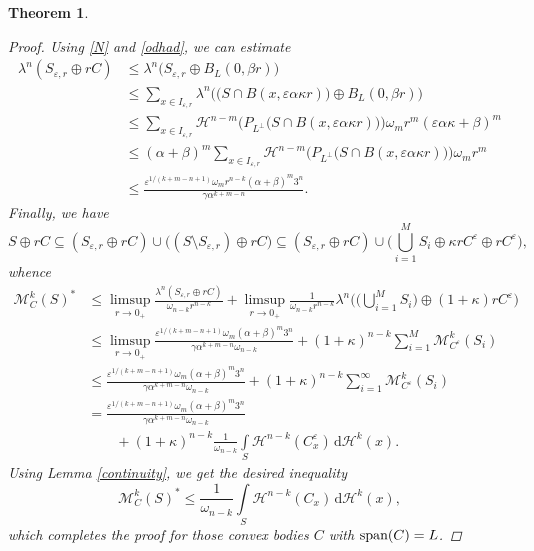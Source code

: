 \documentclass[pdflatex,sn-mathphys-num]{sn-jnl}
\theoremstyle{plain}
\newtheorem{theorem}{Theorem}[section]
\theoremstyle{definition}
\DeclareMathOperator{\LO}{\textup{span}}
\newcommand{\dH}[1]{\,\mathrm d\mathcal{H}^{#1}}
\begin{document}
\begin{theorem}
\begin{proof}
        Using \eqref{N} and \eqref{odhad}, we can estimate \begin{equation*}
            \begin{split}
                \lambda^n(S_{\varepsilon, r}\oplus rC)&\leq\lambda^n\big(S_{\varepsilon, r}\oplus B_{L}(0, \beta r)\big)\\&\leq \sum_{x\in I_{\varepsilon, r}}\lambda^n\Big(\big(S\cap B(x, \varepsilon\alpha\kappa r)\big)\oplus B_{L}(0, \beta r)\Big)\\&\leq \sum_{x\in I_{\varepsilon, r}}\mathcal{H}^{n-m}\Big(P_{L^{\perp}}\big(S\cap B(x, \varepsilon\alpha\kappa r)\big)\Big)\omega_{m}r^m(\varepsilon\alpha\kappa+\beta)^m\\&\leq (\alpha+\beta)^m\sum_{x\in I_{\varepsilon, r}}\mathcal{H}^{n-m}\Big(P_{L^{\perp}}\big(S\cap B(x, \varepsilon\alpha\kappa r)\big)\Big)\omega_{m}r^m\\&\leq\frac{\varepsilon^{1/(k+m-n+1)}\omega_{m} r^{n-k} (\alpha+\beta)^m 3^n}{\gamma\alpha^{k+m-n}}.
            \end{split}
        \end{equation*}
Finally, we have $$S\oplus rC\subseteq (S_{\varepsilon, r}\oplus rC) \cup\big((S\setminus S_{\varepsilon, r})\oplus rC\big)\subseteq (S_{\varepsilon, r}\oplus rC) \cup\Big(\bigcup_{i=1}^M S_i\oplus\kappa r C^{\varepsilon}\oplus rC^{\varepsilon}\Big),$$ whence
\begin{equation*}
            \begin{split}
                \mathcal{M}_C^k(S)^*&\leq \limsup_{r\to0_+}\frac{\lambda^n(S_{\varepsilon, r}\oplus rC)}{\omega_{n-k}r^{n-k}}+\limsup_{r\to0_+}\frac{1}{\omega_{n-k}r^{n-k}}\lambda^n\bigg(\Big(\bigcup_{i=1}^M S_i\Big)\oplus (1+\kappa )rC^{\varepsilon}\bigg)\\&\leq\limsup_{r\to0_+}\frac{\varepsilon^{1/(k+m-n+1)}\omega_{m} (\alpha+\beta)^m 3^n}{\gamma\alpha^{k+m-n}\omega_{n-k}}+(1+\kappa)^{n-k}\sum_{i=1}^M\mathcal{M}^k_{C^{\varepsilon}}(S_i)\\&\leq\frac{\varepsilon^{1/(k+m-n+1)}\omega_{m} (\alpha+\beta)^m 3^n}{\gamma\alpha^{k+m-n}\omega_{n-k}}+(1+\kappa )^{n-k}\sum_{i=1}^{\infty}\mathcal{M}^k_{C^{\varepsilon}}(S_i)\\&=\frac{\varepsilon^{1/(k+m-n+1)}\omega_{m} (\alpha+\beta)^m 3^n}{\gamma\alpha^{k+m-n}\omega_{n-k}}\\&\quad\quad+(1+\kappa )^{n-k}\frac{1}{\omega_{n-k}}\int\limits_{S}\mathcal{H}^{n-k}(C^{\varepsilon}_x)\dH{k}(x).
            \end{split}
        \end{equation*}
        Using Lemma \ref{continuity}, we get the desired inequality $$\mathcal{M}_C^k(S)^*\leq\frac{1}{\omega_{n-k}}\int\limits_{S}\mathcal{H}^{n-k}(C_x)\dH{k}(x),$$ which completes the proof for those convex bodies $C$ with $\LO(C)=L$.


\end{proof}
\end{theorem}
\end{document}
